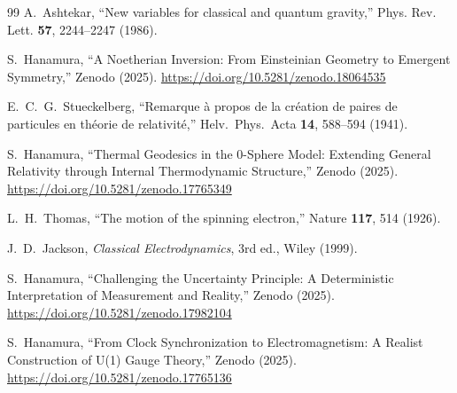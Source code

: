 \documentclass[%
 reprint,
 amsmath,amssymb,
 aps,
 prb,
]{revtex4-2}
\numberwithin{equation}{section}
\begin{document}
\begin{thebibliography}{99}
A.~Ashtekar,
``New variables for classical and quantum gravity,''
Phys. Rev. Lett. \textbf{57}, 2244--2247 (1986).

S.~Hanamura,
``A Noetherian Inversion: From Einsteinian Geometry to Emergent Symmetry,''
Zenodo (2025).
\href{https://doi.org/10.5281/zenodo.18064535}{https://doi.org/10.5281/zenodo.18064535}

E.~C.~G.~Stueckelberg,
``Remarque {\`a} propos de la cr{\'e}ation de paires de particules en th{\'e}orie de relativit{\'e},''
Helv.\ Phys.\ Acta {\bf 14}, 588--594 (1941).

S.~Hanamura,
``Thermal Geodesics in the 0-Sphere Model: Extending General Relativity through Internal Thermodynamic Structure,''
Zenodo (2025).
\href{https://doi.org/10.5281/zenodo.17765349}{https://doi.org/10.5281/zenodo.17765349}

L.~H.~Thomas,
``The motion of the spinning electron,''
Nature \textbf{117}, 514 (1926).

J.~D.~Jackson,
\textit{Classical Electrodynamics},
3rd ed., Wiley (1999).

S.~Hanamura,
``Challenging the Uncertainty Principle: A Deterministic Interpretation of Measurement and Reality,''
Zenodo (2025).
\href{https://doi.org/10.5281/zenodo.17982104}{https://doi.org/10.5281/zenodo.17982104}

S.~Hanamura,
``From Clock Synchronization to Electromagnetism: A Realist Construction of U(1) Gauge Theory,''
Zenodo (2025).
\href{https://doi.org/10.5281/zenodo.17765136}{https://doi.org/10.5281/zenodo.17765136}


\end{thebibliography}
\end{document}
